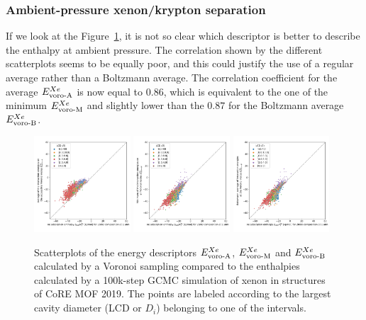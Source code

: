 \documentclass[main]{subfiles}
\begin{document}
\subsubsection{Ambient-pressure xenon/krypton separation}

If we look at the Figure~\ref{fgr:compa_voro_2080}, it is not so clear which descriptor is better to describe the enthalpy at ambient pressure. The correlation shown by the different scatterplots seems to be equally poor, and this could justify the use of a regular average rather than a Boltzmann average. The correlation coefficient for the average $E_{\text{voro-A}}^{Xe}$ is now equal to $0.86$, which is equivalent to the one of the minimum $E_{\text{voro-M}}^{Xe}$ and slightly lower than the $0.87$ for the Boltzmann average $E_{\text{voro-B}}^{Xe}$. 

\begin{figure}[ht]
    \centering
      \includegraphics[width=0.32\textwidth]{figures/3-fastsim/H_Xe_2080_vs_E_voro_A_overview.jpg}
      \includegraphics[width=0.32\textwidth]{figures/3-fastsim/H_Xe_2080_vs_E_voro_M_overview.jpg}
      \includegraphics[width=0.32\textwidth]{figures/3-fastsim/H_Xe_2080_vs_E_voro_B_overview.jpg}
      \caption{Scatterplots of the energy descriptors $E_{\text{voro-A}}^{Xe}$, $E_{\text{voro-M}}^{Xe}$ and $E_{\text{voro-B}}^{Xe}$ calculated by a Voronoi sampling compared to the enthalpies calculated by a 100k-step GCMC simulation of xenon in structures of CoRE MOF 2019. The points are labeled according to the largest cavity diameter (LCD or $D_i$) belonging to one of the intervals.}\label{fgr:compa_voro_2080}
  \end{figure}
  
\end{document}
